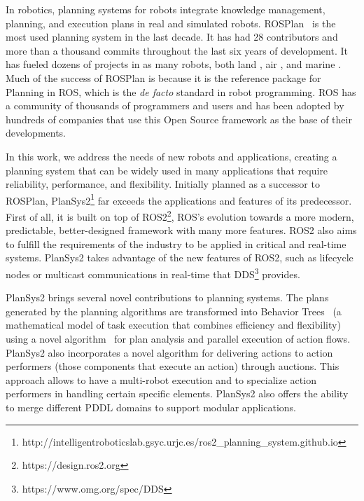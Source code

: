 \documentclass[letterpaper, 10 pt, conference]{IEEEtran}
\begin{document}
In robotics, planning systems for robots integrate knowledge management, planning, and execution plans in real and simulated robots. ROSPlan~\cite{ICAPS1510619} is the most used planning system in the last decade. It has had 28 contributors and more than a thousand commits throughout the last six years of development. It has fueled dozens of projects in as many robots, both land \cite{Miranda2018ARM}\cite{fmartin18}, air \cite{Nogueira18},  and marine \cite{Palomeras16}. Much of the success of ROSPlan is because it is the reference package for Planning in ROS, which is the \emph{de facto} standard in robot programming. ROS \cite{Quigley2009} has a community of thousands of programmers and users and has been adopted by hundreds of companies that use this Open Source framework as the base of their developments. 

In this work, we address the needs of new robots and applications, creating a planning system that can be widely used in many applications that require reliability, performance, and flexibility. Initially planned as a successor to ROSPlan, PlanSys2\footnote{http://intelligentroboticslab.gsyc.urjc.es/ros2\_planning\_system.github.io} far exceeds the applications and features of its predecessor. First of all, it is built on top of ROS2\footnote{https://design.ros2.org}, ROS's evolution towards a more modern, predictable, better-designed framework with many more features. ROS2 also aims to fulfill the requirements of the industry to be applied in critical and real-time systems. PlanSys2 takes advantage of the new features of ROS2, such as lifecycle nodes or multicast communications in real-time that DDS\footnote{https://www.omg.org/spec/DDS} provides.

PlanSys2 brings several novel contributions to planning systems. The plans generated by the planning algorithms are transformed into Behavior Trees~\cite{Colledanchise18} (a mathematical model of task execution that combines efficiency and flexibility) using a novel algorithm~\cite{fmartin21} for plan analysis and parallel execution of action flows. PlanSys2 also incorporates a novel algorithm for delivering actions to action performers (those components that execute an action) through auctions. This approach allows to have a multi-robot execution and to specialize action performers in handling certain specific elements. PlanSys2 also offers the ability to merge different PDDL domains to support modular applications. 

\end{document}
